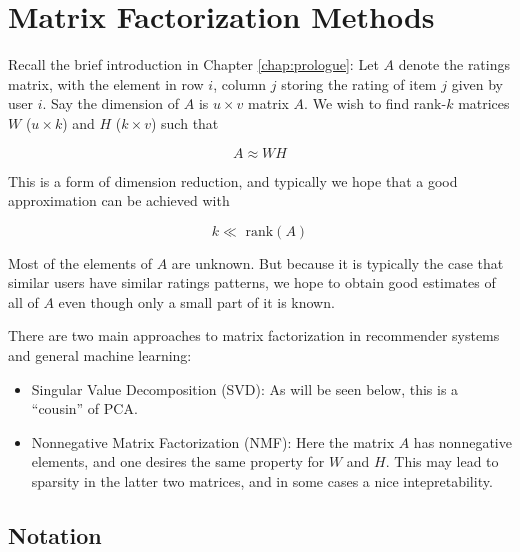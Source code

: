 \chapter{Matrix Factorization Methods}  
\label{chap:svd} 


Recall the brief introduction in Chapter \ref{chap:prologue}:  Let $A$
denote the ratings matrix, with the element in row $i$, column $j$
storing the rating of item $j$ given by user $i$.  Say the dimension of
$A$ is $u \times v$ matrix $A$.  We wish to find rank-$k$ matrices $W$
($u \times k$) and $H$ ($k \times v$) such that

\begin{equation}
\label{awh}
A \approx W H
\end{equation}

This is a form of dimension reduction, and typically we hope that a good
approximation can be achieved with

\begin{equation}
k \ll \textrm{ rank}(A)
\end{equation}

Most of the elements of $A$ are unknown.  But because
it is typically the case that similar users have similar ratings
patterns, we hope to obtain good estimates of all of $A$ even though
only a small part of it is known.

There are two main approaches to matrix factorization in recommender
systems and general machine learning:

\begin{itemize}

\item Singular Value Decomposition (SVD):  As will be seen below, this
is a ``cousin'' of PCA.

\item Nonnegative Matrix Factorization (NMF): Here the matrix $A$ has
nonnegative elements, and one desires the same property for $W$ and $H$.
This may lead to sparsity in the latter two matrices, and in some cases
a nice intepretability.

\end{itemize} 

\section{Notation}

